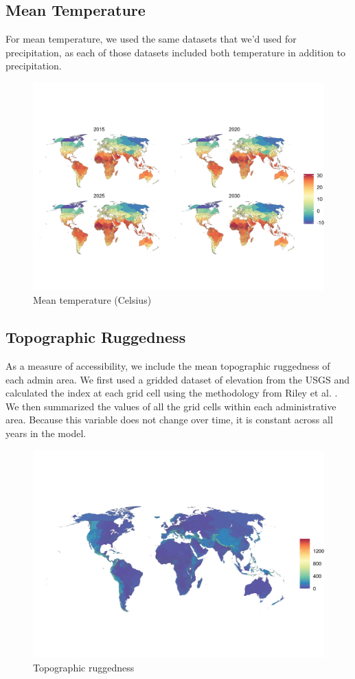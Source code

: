 \documentclass{article}
\begin{document}
\subsection{Mean Temperature}
For mean temperature, we used the same datasets that we'd used for precipitation, as each of those datasets included both temperature in addition to precipitation.

\begin{figure}[H]
  \centering
  \includegraphics[width=\linewidth]{img/covars/tave.png}
  \caption{Mean temperature (Celsius)}
\end{figure}

\subsection{Topographic Ruggedness}
As a measure of accessibility, we include the mean topographic ruggedness of each admin area.  We first used a gridded dataset of elevation from the USGS \cite{USGS1996} and calculated the index at each grid cell using the methodology from Riley et al. \citep{Riley1999}.  We then summarized the values of all the grid cells within each administrative area.  Because this variable does not change over time, it is constant across all years in the model.

\begin{figure}[H]
  \centering
  \includegraphics[width=\linewidth]{img/covars/ruggedness.png}
  \caption{Topographic ruggedness}
\end{figure}
\end{document}
